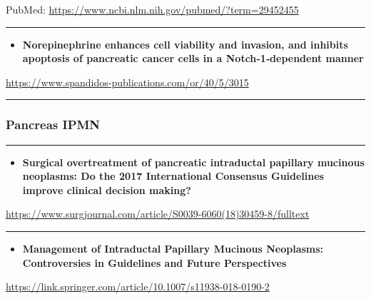 \documentclass[]{article}
\providecommand{\tightlist}{%
  \setlength{\itemsep}{0pt}\setlength{\parskip}{0pt}}
\begin{document}
PubMed: \url{https://www.ncbi.nlm.nih.gov/pubmed/?term=29452455}

{}

{}

\begin{center}\rule{0.5\linewidth}{\linethickness}\end{center}

\begin{itemize}
\tightlist
\item
  \textbf{Norepinephrine enhances cell viability and invasion, and
  inhibits apoptosis of pancreatic cancer cells in a Notch‑1‑dependent
  manner}
\end{itemize}

\url{https://www.spandidos-publications.com/or/40/5/3015}

\begin{center}\rule{0.5\linewidth}{\linethickness}\end{center}

\hypertarget{pancreas-ipmn}{%
\subsubsection{Pancreas IPMN}\label{pancreas-ipmn}}

\begin{center}\rule{0.5\linewidth}{\linethickness}\end{center}

\begin{itemize}
\tightlist
\item
  \textbf{Surgical overtreatment of pancreatic intraductal papillary
  mucinous neoplasms: Do the 2017 International Consensus Guidelines
  improve clinical decision making?}
\end{itemize}

\url{https://www.surgjournal.com/article/S0039-6060(18)30459-8/fulltext}

\begin{center}\rule{0.5\linewidth}{\linethickness}\end{center}

\begin{itemize}
\tightlist
\item
  \textbf{Management of Intraductal Papillary Mucinous Neoplasms:
  Controversies in Guidelines and Future Perspectives}
\end{itemize}

\url{https://link.springer.com/article/10.1007/s11938-018-0190-2}
\end{document}
